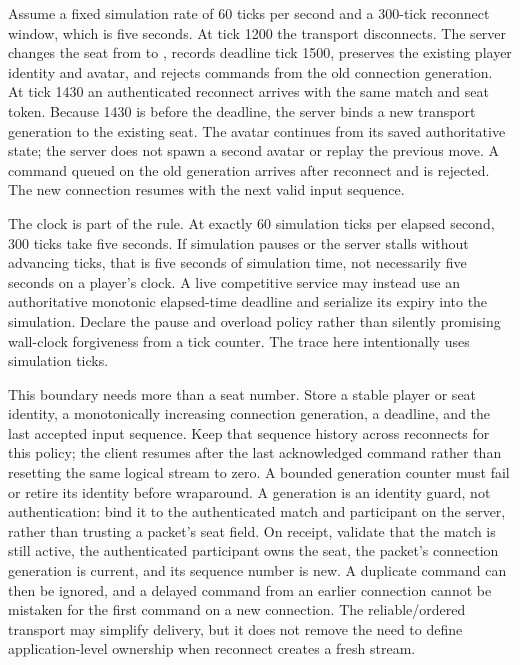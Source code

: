 Assume a fixed simulation rate of 60 ticks per second and a 300-tick reconnect window, which is five seconds. At tick 1200 the transport disconnects. The server changes the seat from  to , records deadline tick 1500, preserves the existing player identity and avatar, and rejects commands from the old connection generation. At tick 1430 an authenticated reconnect arrives with the same match and seat token. Because 1430 is before the deadline, the server binds a new transport generation to the existing seat. The avatar continues from its saved authoritative state; the server does not spawn a second avatar or replay the previous move. A command queued on the old generation arrives after reconnect and is rejected. The new connection resumes with the next valid input sequence.

The clock is part of the rule. At exactly 60 simulation ticks per elapsed second, 300 ticks take five seconds. If simulation pauses or the server stalls without advancing ticks, that is five seconds of simulation time, not necessarily five seconds on a player's clock. A live competitive service may instead use an authoritative monotonic elapsed-time deadline and serialize its expiry into the simulation. Declare the pause and overload policy rather than silently promising wall-clock forgiveness from a tick counter. The trace here intentionally uses simulation ticks.

This boundary needs more than a seat number. Store a stable player or seat identity, a monotonically increasing connection generation, a deadline, and the last accepted input sequence. Keep that sequence history across reconnects for this policy; the client resumes after the last acknowledged command rather than resetting the same logical stream to zero. A bounded generation counter must fail or retire its identity before wraparound. A generation is an identity guard, not authentication: bind it to the authenticated match and participant on the server, rather than trusting a packet's seat field. On receipt, validate that the match is still active, the authenticated participant owns the seat, the packet's connection generation is current, and its sequence number is new. A duplicate command can then be ignored, and a delayed command from an earlier connection cannot be mistaken for the first command on a new connection. The reliable/ordered transport may simplify delivery, but it does not remove the need to define application-level ownership when reconnect creates a fresh stream.

